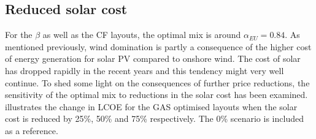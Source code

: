 \documentclass[a4paper, 5p, sort&compress]{elsarticle}%
\begin{document}
%
%

\subsection{Reduced solar cost}
\label{sec:reduced-solar-cost}

For the $\beta$ as well as the CF layouts, the optimal mix is around
$\alpha_{EU}=0.84$. As mentioned previously, wind domination is partly a
consequence of the higher cost of energy generation for solar PV
compared to onshore wind. The cost of solar has dropped rapidly in the
recent years and this tendency might very well continue. To shed some
light on the consequences of further price reductions, the sensitivity
of the optimal mix to reductions in the solar cost has been
examined.  illustrates the change in LCOE for the
GAS optimised layouts when the solar cost is reduced by 25\%, 50\% and
75\% respectively. The 0\% scenario is included as a reference.
\end{document}
